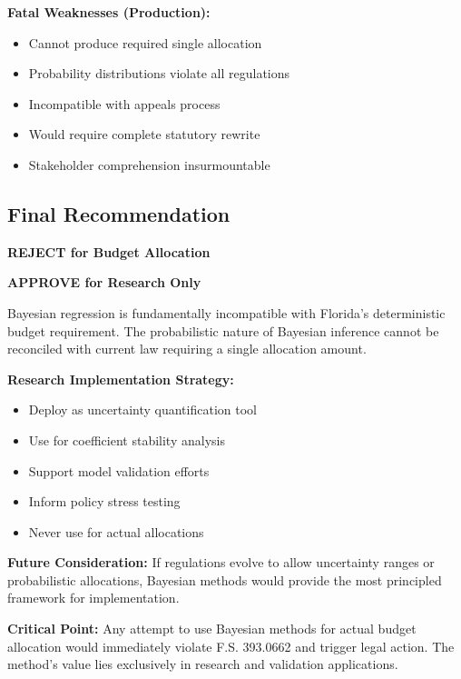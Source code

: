 \textbf{Fatal Weaknesses (Production):}
\begin{itemize}
    \item Cannot produce required single allocation
    \item Probability distributions violate all regulations
    \item Incompatible with appeals process
    \item Would require complete statutory rewrite
    \item Stakeholder comprehension insurmountable
\end{itemize}

\subsection{Final Recommendation}

\textbf{REJECT for Budget Allocation}

\textbf{APPROVE for Research Only}

Bayesian regression is fundamentally incompatible with Florida's deterministic budget requirement. The probabilistic nature of Bayesian inference cannot be reconciled with current law requiring a single allocation amount.

\textbf{Research Implementation Strategy:}
\begin{itemize}
    \item Deploy as uncertainty quantification tool
    \item Use for coefficient stability analysis
    \item Support model validation efforts
    \item Inform policy stress testing
    \item Never use for actual allocations
\end{itemize}

\textbf{Future Consideration:} If regulations evolve to allow uncertainty ranges or probabilistic allocations, Bayesian methods would provide the most principled framework for implementation.

\textbf{Critical Point:} Any attempt to use Bayesian methods for actual budget allocation would immediately violate F.S. 393.0662 and trigger legal action. The method's value lies exclusively in research and validation applications.
 